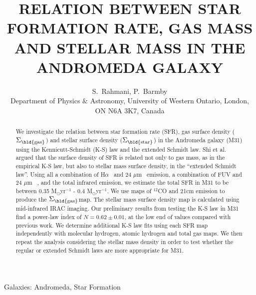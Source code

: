 \documentclass[useAMS,usenatbib]{mn2e}
\newcommand \sigmagas    {$\Sigma_{\rm \bld {gas }}$}
\newcommand \sigmastar    {$\Sigma_{\rm \bld {star }}$}
\newcommand \halpha    {H$\alpha$ \ }
\newcommand \um    {$\mu$m \ }
\begin{document}
\title[WHICH STAR FORMATION LAW IN M31]{RELATION BETWEEN STAR FORMATION RATE, GAS MASS AND STELLAR MASS IN THE ANDROMEDA GALAXY}
\author[S. Rahmani $\&$ P. Barmby]{S.~Rahmani, P.~Barmby\\
Department of Physics $\&$ Astronomy, University of Western Ontario, London, ON N6A 3K7, Canada}
\maketitle

\begin{abstract} %
 We investigate the relation between star formation rate (SFR), gas surface density (\sigmagas) and stellar surface density (\sigmastar) in the Andromeda galaxy (M31) using the Kennicutt-Schmidt (K-S) law and the extended Schmidt law. Shi et al. argued that the surface density of SFR is related not only to gas mass, as in the empirical K-S law,  but also to stellar mass surface density, in the ``extended Schmidt law''. Using all a combination of \halpha and 24 \um emission, a combination of FUV and 24 \um, and the total infrared emission, we estimate the total SFR in M31 to be between 0.35 M$_{\odot}$yr$^{-1}$ - 0.4 M$_{\odot}$yr$^{-1}$. We use maps of $^{12}$CO and 21cm emission to produce the \sigmagas map.%
 The stellar mass surface density  map is calculated using mid-infrared IRAC imaging. Our preliminary results from testing the K-S law in M31 find a power-law index of  $N = 0.62 \pm 0.01$, at the low end of values compared with previous work. We determine additional K-S law fits using each SFR map independently with molecular hydrogen, atomic hydrogen and total gas maps. We then repeat the analysis considering the stellar mass density in order to test whether the regular or extended Schmidt laws are more appropriate for M31.

\end{abstract}
\begin{keywords}
Galaxies: Andromeda, Star Formation
\end{keywords}
\end{document}

